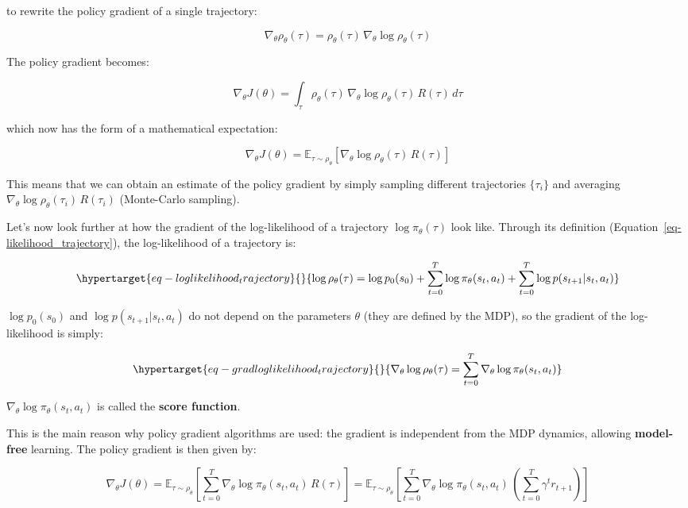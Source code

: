 \documentclass[
  letterpaper,
  DIV=11,
  numbers=noendperiod]{scrreprt}
\begin{document}
to rewrite the policy gradient of a single trajectory:

\[
    \nabla_\theta \rho_\theta (\tau) = \rho_\theta (\tau) \, \nabla_\theta \log \rho_\theta (\tau)
\]

The policy gradient becomes:

\[
    \nabla_\theta J(\theta) =  \int_\tau \rho_\theta (\tau) \, \nabla_\theta \log \rho_\theta (\tau) \, R(\tau) \, d\tau
\]

which now has the form of a mathematical expectation:

\[
    \nabla_\theta J(\theta) =  \mathbb{E}_{\tau \sim \rho_\theta}[ \nabla_\theta \log \rho_\theta (\tau) \, R(\tau) ]
\]

This means that we can obtain an estimate of the policy gradient by
simply sampling different trajectories \(\{\tau_i\}\) and averaging
\(\nabla_\theta \log \rho_\theta (\tau_i) \, R(\tau_i)\) (Monte-Carlo
sampling).

Let's now look further at how the gradient of the log-likelihood of a
trajectory \(\log \pi_\theta (\tau)\) look like. Through its definition
(Equation~\ref{eq-likelihood_trajectory}), the log-likelihood of a
trajectory is:

\begin{equation}\protect\hypertarget{eq-loglikelihood_trajectory}{}{
    \log \rho_\theta(\tau) = \log p_0 (s_0) + \sum_{t=0}^T \log \pi_\theta(s_t, a_t) + \sum_{t=0}^T \log p(s_{t+1} | s_t, a_t)
}\label{eq-loglikelihood_trajectory}\end{equation}

\(\log p_0 (s_0)\) and \(\log p(s_{t+1} | s_t, a_t)\) do not depend on
the parameters \(\theta\) (they are defined by the MDP), so the gradient
of the log-likelihood is simply:

\begin{equation}\protect\hypertarget{eq-gradloglikelihood_trajectory}{}{
    \nabla_\theta \log \rho_\theta(\tau) = \sum_{t=0}^T \nabla_\theta \log \pi_\theta(s_t, a_t)
}\label{eq-gradloglikelihood_trajectory}\end{equation}

\(\nabla_\theta \log \pi_\theta(s_t, a_t)\) is called the \textbf{score
function}.

This is the main reason why policy gradient algorithms are used: the
gradient is independent from the MDP dynamics, allowing
\textbf{model-free} learning. The policy gradient is then given by:

\[
    \nabla_\theta J(\theta) =  \mathbb{E}_{\tau \sim \rho_\theta}[\sum_{t=0}^T \nabla_\theta \log \pi_\theta(s_t, a_t) \, R(\tau) ] =  \mathbb{E}_{\tau \sim \rho_\theta}[ \sum_{t=0}^T \nabla_\theta \log \pi_\theta(s_t, a_t) \, (\sum_{t=0}^T \gamma^t r_{t+1})]
\]
\end{document}
